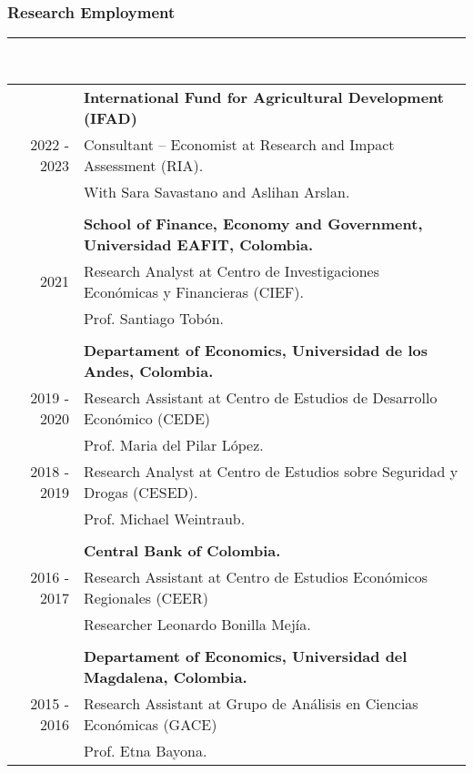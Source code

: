 \documentclass[12pt]{article}
\begin{document}
\subsubsection*{Research Employment}
\vspace{-20pt}
\rule{\textwidth}{1pt} \hfill \\
\begin{tabular}{r|p{15cm}}
     & \textbf{International Fund for Agricultural Development (IFAD)} \\
2022 - 2023  & Consultant – Economist at Research and Impact Assessment (RIA).\\
 & With Sara Savastano and Aslihan Arslan. \\
\multicolumn{2}{c}{} \\
   & \textbf{School of Finance, Economy and Government, Universidad EAFIT, Colombia.} \\
2021 & Research Analyst at Centro de Investigaciones Económicas y Financieras (CIEF).\\
     & Prof. Santiago Tobón. \\
\multicolumn{2}{c}{} \\
 & \textbf{Departament of Economics, Universidad de los Andes, Colombia.} \\
2019 - 2020 & Research Assistant at Centro de Estudios de Desarrollo Económico (CEDE) \\
            & Prof. Maria del Pilar López. \\
2018 - 2019 & Research Analyst at Centro de Estudios sobre Seguridad y Drogas (CESED). \\
            & Prof. Michael Weintraub. \\
\multicolumn{2}{c}{} \\
            & \textbf{Central Bank of Colombia.} \\
2016 - 2017 & Research Assistant at Centro de Estudios Económicos Regionales (CEER) \\
            & Researcher Leonardo Bonilla Mejía. \\
\multicolumn{2}{c}{} \\
            & \textbf{Departament of Economics, Universidad del Magdalena, Colombia.} \\
2015 - 2016 & Research Assistant at Grupo de Análisis en Ciencias Económicas (GACE) \\
            & Prof.  Etna Bayona. \\
\end{tabular}
\vspace{220pt}
\end{document}
